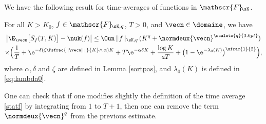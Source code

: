 We have the following result for time-averages of functions in $\mathscr{F}\!_{\sK}$.
\begin{theorem}\label{pseudoergod}
For all $K>K_0$, $f\in\mathscr{F}\!_{\sK,q}$, $T>0$, and $\vecn\in \domaine$, we have
\begin{multline*}
\left|\E_{\vecn}\bigl[S_{f}(T,K)\bigr]-\nuk(f)\right|
\leq \Oun\, \|f\|_{\sK,q}\,(K^{q}+\normdeux{\vecn}^{\scaleto{q}{3.6pt}})\\
\times \Bigl(\frac{1}{T} + \e^{-\delta\left(\zeta\Psfrac{\|\vecn\|_{1}}{K}\wedge\,\alpha\right)K}
+T\e^{-\alpha\delta K}+\frac{\log K}{a T}+ \bigl(1-\e^{-\lambda_0(K)}\bigr)^{\sfrac{1}{2}} \Bigr),
\end{multline*}
where $\alpha, \delta$ and $\zeta$ are defined in Lemma \ref{sortpas}, and $\lambda_0(K)$ is defined in \eqref{eq:lambda0}.
\end{theorem}
\begin{remark}
One can check that if one modifies slightly the definition of the time average \eqref{statf} by integrating from $1$ to $T+1$,
then one can remove the term $\normdeux{\vecn}^{q}$ from the previous estimate.
\end{remark}
